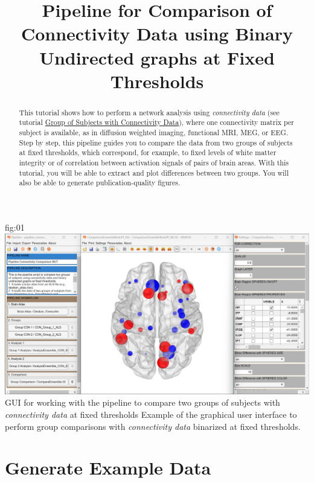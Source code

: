 \documentclass[justified]{tufte-handout}
\title[Comparison of Connectivity Data using BUT]{Pipeline for Comparison of Connectivity Data using Binary Undirected graphs at Fixed Thresholds}
\begin{document}
\maketitle

\begin{abstract}
\noindent
This tutorial shows how to perform a network analysis using \emph{connectivity data} (see tutorial \href{https://github.com/braph-software/BRAPH-2/tree/develop/tutorials/general/tut_gr_con}{Group of Subjects with Connectivity Data}), where one connectivity matrix per subject is available, as in diffusion weighted imaging, functional MRI, MEG, or EEG. Step by step, this pipeline guides you to compare the data from two groups of subjects at fixed thresholds, which correspond, for example, to fixed levels of white matter integrity or of correlation between activation signals of pairs of brain areas.  With this tutorial, you will be able to extract and plot differences between two groups. You will also be able to generate publication-quality figures.
\end{abstract}

\tableofcontents

	{fig:01}
	{\includegraphics{fig01.jpg}}
	{GUI for working with the pipeline to compare two groups of subjects with \emph{connectivity data} at fixed thresholds}
	{
	Example of the graphical user interface to perform group comparisons with \emph{connectivity data} binarized at fixed thresholds.
	}

\clearpage
\section{Generate Example Data}
\end{document}
